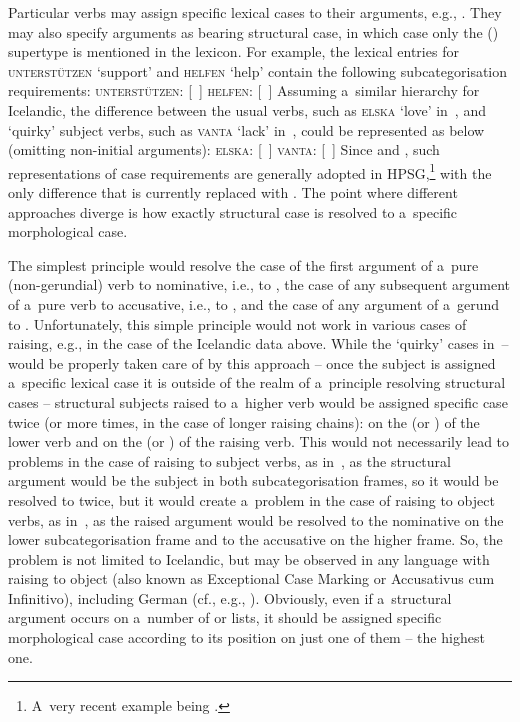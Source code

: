 \documentclass[output=paper]{langsci/langscibook}
\begin{document}
Particular verbs may assign specific lexical cases to their arguments, e.g., .  They may also specify arguments as bearing structural case, in which case only the () supertype is mentioned in the lexicon.  For example, the lexical entries for \textsc{unterst\"utzen} `support’ and \textsc{helfen} `help’ contain the following subcategorisation requirements:
\eal
\label{ex:hmsubcats}
\ex \textsc{unterst\"utzen}: [~] 
\ex \textsc{helfen}: [~]
\zl
Assuming a~similar  hierarchy for Icelandic, the difference between the usual verbs, such as \textsc{elska} `love’ in~, and `quirky’ subject verbs, such as \textsc{vanta} `lack’ in~, could be represented as below (omitting non-initial arguments):
\eal
\label{ex:islsubcats}
\ex \textsc{elska}: [~] 
\ex \textsc{vanta}: [~]
\zl
Since \citealt{Pollard94a} and \citealt{HM94a}, such representations of case requirements are generally adopted in HPSG,\footnote{A~very recent example being \citealt{mac:hue:18}.} with the only difference that  is currently replaced with .  The point where different approaches diverge is how exactly structural case is resolved to a~specific morphological case.

The simplest principle would resolve the case of the first  argument of a~pure (non-gerundial) verb to nominative, i.e., to , the case of any subsequent  argument of a~pure verb to accusative, i.e., to , and the case of any  argument of a~gerund to .  Unfortunately, this simple principle would not work in various cases of raising, e.g., in the case of the Icelandic data above.  While the `quirky’ cases in~– would be properly taken care of by this approach – once the subject is assigned a~specific lexical case it is outside of the realm of a~principle resolving structural cases – structural subjects raised to a~higher verb would be assigned specific case twice (or more times, in the case of longer raising chains): on the  (or ) of the lower verb and on the  (or ) of the raising verb.  This would not necessarily lead to problems in the case of raising to subject verbs, as in~, as the structural argument would be the subject in both subcategorisation frames, so it would be resolved to  twice, but it would create a~problem in the case of raising to object verbs, as in~, as the raised argument would be resolved to the nominative on the lower subcategorisation frame and to the accusative on the higher frame.  So, the problem is not limited to Icelandic, but may be observed in any language with raising to object (also known as Exceptional Case Marking or Accusativus cum Infinitivo), including German (cf., e.g., \citealt[231]{HM94a}).  Obviously, even if a~structural argument occurs on a~number of  or  lists, it should be assigned specific morphological case according to its position on just one of them – the highest one.
\end{document}
